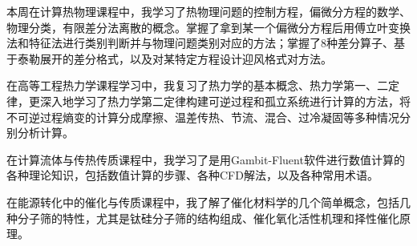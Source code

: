 \documentclass[oneside]{report}
\begin{document}
本周在计算热物理课程中，我学习了热物理问题的控制方程，偏微分方程的数学、物理分类，有限差分法离散的概念。掌握了拿到某一个偏微分方程后用傅立叶变换法和特征法进行类别判断并与物理问题类别对应的方法；掌握了8种差分算子、基于泰勒展开的差分格式，以及对某特定方程设计迎风格式对方法。

在高等工程热力学课程学习中，我复习了热力学的基本概念、热力学第一、二定律，更深入地学习了热力学第二定律构建可逆过程和孤立系统进行计算的方法，将不可逆过程熵变的计算分成摩擦、温差传热、节流、混合、过冷凝固等多种情况分别分析计算。

在计算流体与传热传质课程中，我学习了是用Gambit-Fluent软件进行数值计算的各种理论知识，包括数值计算的步骤、各种CFD解法，以及各种常用术语。

在能源转化中的催化与传质课程中，我了解了催化材料学的几个简单概念，包括几种分子筛的特性，尤其是钛硅分子筛的结构组成、催化氧化活性机理和择性催化原理。
\end{document}

